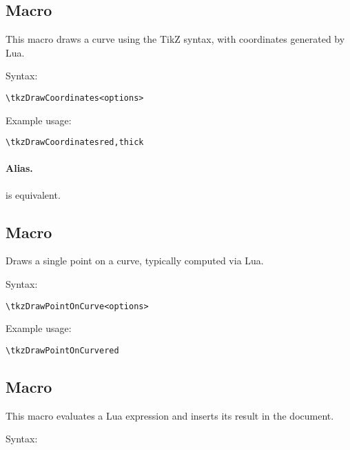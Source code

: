\subsection{Macro }
This macro draws a curve using the TikZ  syntax, with coordinates generated by Lua.

\medskip
\noindent
Syntax:

\begin{verbatim}
\tkzDrawCoordinates<options>
\end{verbatim}

\noindent
Example usage:

\begin{mybox}
\begin{verbatim}
\tkzDrawCoordinatesred,thick
\end{verbatim}
\end{mybox}

\paragraph{Alias.}  is equivalent.

\subsection{Macro }

Draws a single point on a curve, typically computed via Lua.

\medskip
\noindent
Syntax:

\begin{verbatim}
\tkzDrawPointOnCurve<options>
\end{verbatim}

\noindent
Example usage:

\begin{mybox}
\begin{verbatim}
\tkzDrawPointOnCurvered
\end{verbatim}
\end{mybox}

\subsection{Macro }

This macro evaluates a Lua expression and inserts its result in the document.

\medskip
\noindent
Syntax:

